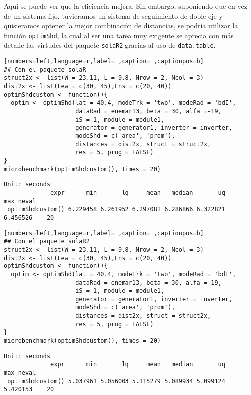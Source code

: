 \begin{itemize}
Aquí se puede ver que la eficiencia mejora. Sin embargo, suponiendo que en vez de un sistema fijo, tuvieramos un sistema de seguimiento de doble eje y quisieramos optener la mejor combinación de distancias, se podría utilizar la función \texttt{optimShd}, la cual al ser una tarea muy exigente se aprecia con más detalle las virtudes del paquete \texttt{solaR2} gracias al uso de \texttt{data.table}.
\begin{lstlisting}[numbers=left,language=r,label= ,caption= ,captionpos=b]
## Con el paquete solaR
struct2x <- list(W = 23.11, L = 9.8, Nrow = 2, Ncol = 3)
dist2x <- list(Lew = c(30, 45),Lns = c(20, 40))
optimShdcustom <- function(){  
  optim <- optimShd(lat = 40.4, modeTrk = 'two', modeRad = 'bdI',
                    dataRad = enemar13, beta = 30, alfa =-19,
                    iS = 1, module = module1,
                    generator = generator1, inverter = inverter,
                    modeShd = c('area', 'prom'),
                    distances = dist2x, struct = struct2x,
                    res = 5, prog = FALSE)
}
microbenchmark(optimShdcustom(), times = 20)
\end{lstlisting}

\begin{verbatim}
Unit: seconds
             expr      min       lq     mean   median       uq      max neval
 optimShdcustom() 6.229458 6.261952 6.297081 6.286866 6.322821 6.456526    20
\end{verbatim}


\begin{lstlisting}[numbers=left,language=r,label= ,caption= ,captionpos=b]
## Con el paquete solaR2
struct2x <- list(W = 23.11, L = 9.8, Nrow = 2, Ncol = 3)
dist2x <- list(Lew = c(30, 45),Lns = c(20, 40))
optimShdcustom <- function(){  
  optim <- optimShd(lat = 40.4, modeTrk = 'two', modeRad = 'bdI',
                    dataRad = enemar13, beta = 30, alfa =-19,
                    iS = 1, module = module1,
                    generator = generator1, inverter = inverter,
                    modeShd = c('area', 'prom'),
                    distances = dist2x, struct = struct2x,
                    res = 5, prog = FALSE)
}
microbenchmark(optimShdcustom(), times = 20)
\end{lstlisting}

\begin{verbatim}
Unit: seconds
             expr      min       lq     mean   median       uq      max neval
 optimShdcustom() 5.037961 5.056003 5.115279 5.089934 5.099124 5.420153    20
\end{verbatim}
\end{itemize}
